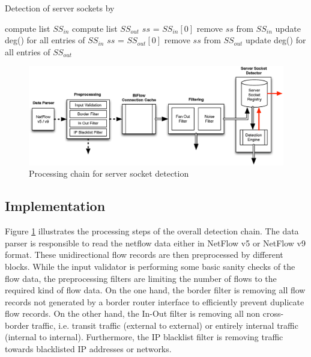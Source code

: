 
\begin{algorithm}[t!]
\caption{Detection of server sockets by \citet{Schatzmann:Mining,Schatzmann:Dissection, Schatzmann:Tracing}}
\label{alg:service_tracing_ss-detection}
\begin{algorithmic}
\STATE
\STATE compute list $SS_{in}$ 
\STATE compute list $SS_{out}$ 
\STATE
{}
        \STATE $ss$ = $SS_{in}[0]$ 
        \STATE remove $ss$ from $SS_{in}$
        \STATE update deg() for all entries of $SS_{in}$
    \ENDWHILE
        \STATE $ss$ = $SS_{out}[0]$ 
        \STATE remove $ss$ from $SS_{out}$
        \STATE update deg() for all entries of $SS_{out}$
    \ENDWHILE
\ENDWHILE
\end{algorithmic}
\end{algorithm}

\begin{figure}
	[ht] \centering
	\includegraphics[width=\linewidth]{images/Detection_chain.eps}
	\caption{Processing chain for server socket detection}
	\label{fig:detection_chain}
\end{figure}

\subsection{Implementation}
Figure \ref{fig:detection_chain} illustrates the processing steps of the
overall detection chain. The data parser is responsible to read the netflow data
either in NetFlow v5 or NetFlow v9 format. These unidirectional flow records are
then preprocessed by different blocks. While the input validator is performing
some basic sanity checks of the flow data, the preprocessing filters are
limiting the number of flows to the required kind of flow data. On the one hand,
the border filter is removing all flow records not generated by a border router
interface to efficiently prevent duplicate flow records. On the other hand, the
In-Out filter is removing all non cross-border traffic, i.e. transit traffic
(external to external) or entirely internal traffic (internal to internal).
Furthermore, the IP blacklist filter is removing traffic towards blacklisted IP
addresses or networks.

